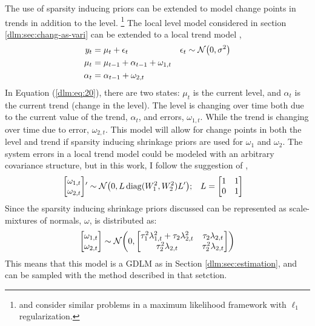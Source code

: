 The use of sparsity inducing priors can be extended to model change points in trends in addition to the level.%
\footnote{\textcite{KimKohBoydEtAl2009} and \textcite{Tibshirani2014} consider similar problems in a maximum likelihood framework with $\ell_{1}$ regularization.}
The local level model considered in section \ref{dlm:sec:chang-as-vari} can be extended to a local trend model \parencites[Ch 3.2]{DurbinKoopman2012}[Ch 7]{WestHarrison1997},
\begin{equation}
  \label{dlm:eq:20}
  \begin{aligned}[t]
    y_{t} &= \mu_{t} + \epsilon_{t} & \epsilon_{t} & \sim \mathcal{N}\mathopen{}\left(0, \sigma^{2}\right)\mathclose{} \\
    \mu_{t} &= \mu_{t - 1} + \alpha_{t - 1} + \omega_{1, t} \\
    \alpha_{t} &= \alpha_{t - 1} + \omega_{2, t} 
  \end{aligned}
\end{equation}
In Equation (\ref{dlm:eq:20}), there are two states: $\mu_{t}$ is the current level, and $\alpha_{t}$ is the current trend (change in the level).
The level is changing over time both due to the current value of the trend, $\alpha_{t}$, and errors, $\omega_{1,t}$.
While the trend is changing over time due to error, $\omega_{2,t}$.
This model will allow for change points in both the level and trend if sparsity inducing shrinkage priors are used for $\omega_{1}$ and $\omega_{2}$.
The system errors in a local trend model could be modeled with an arbitrary covariance structure, but in this work, I follow the suggestion of \parencite[Ch 7.]{WestHarrison1997},
\begin{equation}
  \label{dlm:eq:29}
  \begin{aligned}[t]
  \begin{bmatrix}
    \omega_{1, t} \\
    \omega_{2, t}
  \end{bmatrix} 
  & '\sim \mathcal{N}\mathopen{}\left(0,
    L \operatorname{diag}(W_{1}^{2}, W_{2}^{2}) L'
  \right)\mathclose{} ; &
  L &= 
  \begin{bmatrix}
    1 & 1 \\
    0 & 1 
  \end{bmatrix}
  \end{aligned}
\end{equation}
Since the sparsity inducing shrinkage priors discussed can be represented as scale-mixtures of normals, $\omega$, is distributed as:
\begin{equation}
\label{dlm:eq:26}
\begin{bmatrix}
  \omega_{1, t} \\
  \omega_{2, t}
\end{bmatrix}
\sim \mathcal{N}\mathopen{}\left(0,
  \begin{bmatrix}
    \tau_{1}^{2} \lambda_{1, t}^{2} + \tau_{2} \lambda_{2, t}^{2} & \tau_{2} \lambda_{2, t} \\
    \tau_{2}^{2} \lambda_{2, t} & \tau_{2}^{2} \lambda_{2, t}
  \end{bmatrix}
\right)\mathclose{}
\end{equation}
This means that this model is a GDLM as in Section \ref{dlm:sec:estimation}, and can be sampled with the method described in that setction.



